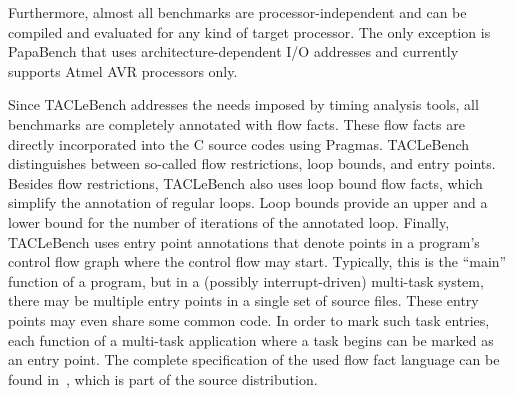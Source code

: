 \documentclass[a4paper,UKenglish]{oasics}
\newcommand{\code}[1]{{\small{\texttt{#1}}}}
\begin{document}
Furthermore, almost all benchmarks are processor-independent and can
be compiled and evaluated for any kind of target processor.
The only exception is PapaBench that uses architecture-dependent
I/O addresses and currently supports Atmel AVR processors only.

Since TACLeBench addresses the needs imposed by timing analysis tools,
all benchmarks are completely annotated with flow facts.
These flow facts are directly incorporated into the C source codes using
Pragmas. %
TACLeBench distinguishes between so-called flow restrictions, loop bounds, and entry points.
Besides flow restrictions, TACLeBench also uses loop bound flow facts, which simplify the annotation of regular loops.
Loop bounds provide an upper and a lower bound for the number of iterations of the annotated loop.
%
Finally, TACLeBench uses entry point annotations that denote points in a program's control flow graph where the control flow may start.
Typically, this is the ``main'' function of a program, but in a (possibly interrupt-driven) multi-task system, there may be multiple entry points in a single set of source files.
These entry points may even share some common code.
In order to mark such task entries, each function of a multi-task application where a task begins can be marked as an entry point.
%
%
%
%
The complete specification of the used flow fact language can be found in~\cite{flowfacts},
which is part of the source distribution.
\end{document}

